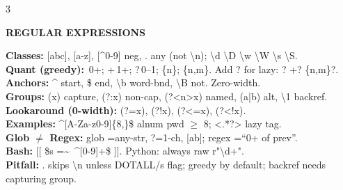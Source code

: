 \documentclass[10pt,letterpaper]{article}
\newenvironment{topic}[1]{%
  \par\addvspace{1.5pt}%
  \noindent\colorbox{hdrBG}{%
    \begin{minipage}{\dimexpr\linewidth-2\fboxsep\relax}%
      \centering\bfseries\sffamily\fontsize{6pt}{7pt}\selectfont\color{hdrFG}\MakeUppercase{#1}%
    \end{minipage}%
  }\par\nobreak\vskip0.5pt%
  \begingroup\setlength{\leftskip}{0pt}\setlength{\rightskip}{0pt}%
}{%
  \endgroup\par\addvspace{0.5pt}%
}
\newcommand{\warn}[1]{\textcolor{warnC}{\textbf{#1}}}
\newcommand{\hd}[1]{\textcolor{accent}{\textbf{#1}}}
\newcommand{\cn}[1]{{\ttfamily\small #1}}
\begin{document}
\begin{multicols*}{3}
\begin{topic}{Regular Expressions}
\hd{Classes:} \cn{[abc]}, \cn{[a-z]}, \cn{[\textasciicircum 0-9]} neg, \cn{.} any (not \cn{\textbackslash n}); \cn{\textbackslash d \textbackslash D \textbackslash w \textbackslash W \textbackslash s \textbackslash S}.\\
\hd{Quant (greedy):} \cn{*}\,0+; \cn{+}\,1+; \cn{?}\,0--1; \cn{\{n\}}; \cn{\{n,m\}}. Add \cn{?} for lazy: \cn{*?  +?  \{n,m\}?}.\\
\hd{Anchors:} \cn{\textasciicircum} start, \cn{\$} end, \cn{\textbackslash b} word-bnd, \cn{\textbackslash B} not. Zero-width.\\
\hd{Groups:} \cn{(x)} capture, \cn{(?:x)} non-cap, \cn{(?<n>x)} named, \cn{(a|b)} alt, \cn{\textbackslash 1} backref.\\
\hd{Lookaround (0-width):} \cn{(?=x)}, \cn{(?!x)}, \cn{(?<=x)}, \cn{(?<!x)}.\\
\hd{Examples:} \cn{\textasciicircum [A-Za-z0-9]\{8,\}\$} alnum pwd $\ge$ 8; \cn{<.*?>} lazy tag.\\
\hd{Glob $\neq$ Regex:} glob \cn{*}=any-str, \cn{?}=1-ch, \cn{[ab]}; regex \cn{*}=``0+ of prev''.\\
\hd{Bash:} \cn{[[ \$s =\textasciitilde\ \textasciicircum [0-9]+\$ ]]}. Python: always raw \cn{r"\textbackslash d+"}.\\
\warn{Pitfall:} \cn{.} skips \cn{\textbackslash n} unless DOTALL/s flag; greedy by default; backref needs capturing group.
\end{topic}


\end{multicols*}
\end{document}
